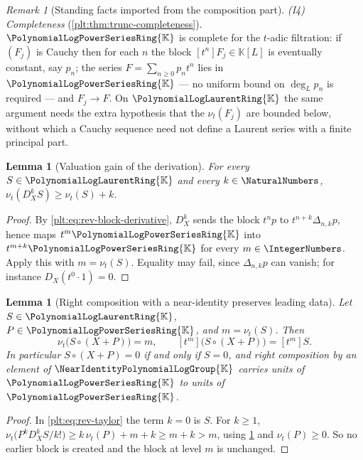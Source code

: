 \documentclass[11pt,oneside]{article}
\theoremstyle{plain}
\newtheorem{lemma}[theorem]{Lemma}
\theoremstyle{definition}
\theoremstyle{remark}
\newtheorem{remark}[theorem]{Remark}
\newcommand{\K}{\mathbb{K}}
\newcommand{\PLpow}{\PolynomialLogPowerSeriesRing{\K}}   %
\newcommand{\PLlau}{\PolynomialLogLaurentRing{\K}}       %
\newcommand{\Gnear}{\NearIdentityPolynomialLogGroup{\K}} %
\newcommand{\ordt}{\nu_{t}}                              %
\newcommand{\DX}{D_{X}}                                  %
\newcommand{\shiftop}[2]{\Delta_{#1,#2}}                 %
\newcommand{\compose}{\mathbin{\circ}}
\begin{document}
\begin{remark}[Standing facts imported from the composition part]
\emph{(I4) Completeness} (\cref{plt:thm:trunc-completeness}).  \(\PLpow\) is complete for the \(t\)-adic
filtration: if \((F_j)\) is Cauchy then for each \(n\) the block
\([t^n]F_j\in\K[L]\) is eventually constant, say \(p_n\); the series
\(F=\sum_{n\ge0}p_nt^n\) lies in \(\PLpow\) --- no uniform bound on
\(\deg_Lp_n\) is required --- and \(F_j\to F\).  On \(\PLlau\) the same
argument needs the extra hypothesis that the \(\ordt(F_j)\) are bounded below,
without which a Cauchy sequence need not define a Laurent series with a finite
principal part.
\end{remark}

\begin{lemma}[Valuation gain of the derivation]
\label{plt:lem:rev-deriv-gain}
For every \(S\in\PLlau\) and every \(k\in\NaturalNumbers\),
\(\ordt(\DX^kS)\ge\ordt(S)+k\).
\end{lemma}

\begin{proof}
By \eqref{plt:eq:rev-block-derivative}, \(\DX^k\) sends the block \(t^np\) to
\(t^{n+k}\shiftop{n}{k}p\), hence maps \(t^m\PLpow\) into \(t^{m+k}\PLpow\) for
every \(m\in\IntegerNumbers\).  Apply this with \(m=\ordt(S)\).  Equality may
fail, since \(\shiftop{n}{k}p\) can vanish; for instance
\(\DX(t^0\cdot1)=0\).
\end{proof}

\begin{lemma}[Right composition with a near-identity preserves leading data]
\label{plt:lem:rev-order-preserved}
Let \(S\in\PLlau\), \(P\in\PLpow\), and \(m=\ordt(S)\).  Then
\[
 \ordt\bigl(S\compose(X+P)\bigr)=m,
 \qquad
 [t^{m}]\bigl(S\compose(X+P)\bigr)=[t^{m}]S .
\]
In particular \(S\compose(X+P)=0\) if and only if \(S=0\), and right
composition by an element of \(\Gnear\) carries units of \(\PLpow\) to units of
\(\PLpow\).
\end{lemma}

\begin{proof}
In \eqref{plt:eq:rev-taylor} the term \(k=0\) is \(S\).  For \(k\ge1\),
\(\ordt\bigl(P^k\DX^kS/k!\bigr)\ge k\,\ordt(P)+m+k\ge m+k>m\), using
\cref{plt:lem:rev-deriv-gain} and \(\ordt(P)\ge0\).  So no earlier block is
created and the block at level \(m\) is unchanged.
\end{proof}

\end{document}

